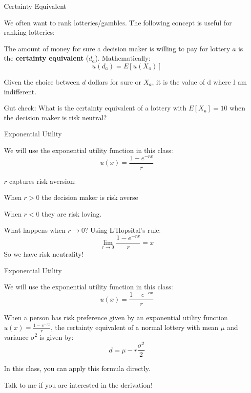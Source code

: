 \documentclass[aspectratio=169,usenames,dvipsnames]{beamer}
\newenvironment{wideitemize}{\itemize\addtolength{\itemsep}{10pt}}{\enditemize}
\begin{document}
\begin{frame}{Certainty Equivalent}

\begin{wideitemize}
    \item We often want to rank lotteries/gambles. The following concept is useful for ranking lotteries:
    \begin{definition}
    The amount of money for sure a decision maker is willing to pay for lottery $a$ is the \textbf{certainty equivalent} ($d_a$). Mathematically:
    \[u(d_a) = E[u(X_a)]\]
    \end{definition}
    \item Given the choice between $d$ dollars for sure or $X_a$, it is the value of d where I am indifferent.
    \pause \item Gut check: What is the certainty equivalent of a lottery with $E[X_a]=10$ when the decision maker is risk neutral?
\end{wideitemize}
\end{frame}

\begin{frame}{Exponential Utility}
\begin{wideitemize}
    \item We will use the exponential utility function in this class:
    \[u(x) = \frac{1-e^{-r x}}{r} \]
    \item $r$ captures risk aversion:
    \begin{wideitemize}
        \item When $r>0$ the decision maker is risk averse
    
        \item When $r<0$ they are risk loving.
    
    \end{wideitemize}

           \item What happens when $r \to 0$? Using L'Hopsital's rule:
       \[\lim_{r \to 0}  \frac{1-e^{-r x}}{r} = x\]
       So we have risk neutrality!
       
\end{wideitemize}

\end{frame}
\begin{frame}{Exponential Utility}
\begin{wideitemize}
    \item We will use the exponential utility function in this class:
    \[u(x) = \frac{1-e^{-r x}}{r} \]
    \begin{theorem}
        When a person has risk preference given by an exponential utility function $u(x) = \frac{1-e^{-r x}}{r}$, the certainty equivalent of a normal lottery with mean $\mu$ and variance $\sigma^2$ is given by:
        \[d = \mu -r \frac{\sigma^2}{2}\]
    \end{theorem}
    \item In this class, you can apply this formula directly.
    \item Talk to me if you are interested in the derivation!
\end{wideitemize}
\end{frame}
\end{document}
